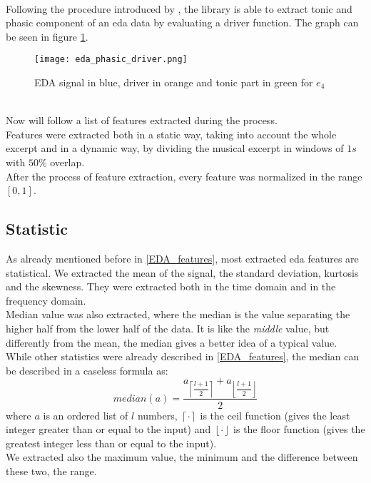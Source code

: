 \\
Following the procedure introduced by \cite{bizzego2019pyphysio}, the library is able to extract tonic and phasic component of an \gls{eda} data by evaluating a driver function. The graph can be seen in figure \ref{fig:eda_phasic_driver}.
\begin{figure}[h]
    \centering
    \texttt{[image: eda\_phasic\_driver.png]} 
	\caption{EDA signal in blue, driver in orange and tonic part in green for $e_4$}
    \label{fig:eda_phasic_driver}
\end{figure}
\\
Now will follow a list of features extracted during the process.
\\
Features were extracted both in a static way, taking into account the whole excerpt and in a dynamic way, by dividing the musical excerpt in windows of $1s$ with $50\%$ overlap.
\\
After the process of feature extraction, every feature was normalized in the range $[0,1]$.

\subsection{Statistic}
As already mentioned before in \ref{EDA_features}, most extracted \gls{eda} features are statistical. We extracted the mean of the signal, the standard deviation, kurtosis and the skewness. They were extracted both in the time domain and in the frequency domain.
\\ \indent
Median value was also extracted, where the median is the value separating the higher half from the lower half of the data. It is like the \textit{middle} value, but differently from the mean, the median gives a better idea of a typical value.
\\
While other statistics were already described in \ref{EDA_features}, the median can be described in a caseless formula as:
\begin{equation}
	median(a)=\dfrac{a_{\left \lceil{\dfrac{l+1}{2}}\right \rceil}+a_{\left \lfloor{\dfrac{l+1}{2}}\right \rfloor}}{2}
\end{equation}
where $a$ is an ordered list of $l$ numbers, $\left \lceil {\cdot} \right \rceil$ is the ceil function (gives the least integer greater than or equal to the input) and $\left \lfloor {\cdot} \right \rfloor$ is the floor function (gives the greatest integer less than or equal to the input).
\\ \indent
We extracted also the maximum value, the minimum and the difference between these two, the range.

